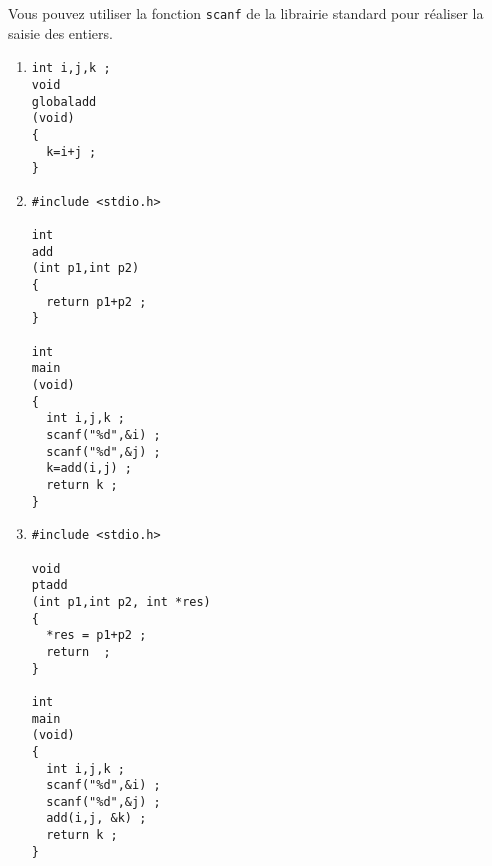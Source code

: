 Vous pouvez utiliser la fonction \texttt{scanf} de la librairie standard pour r\'ealiser la 
saisie des entiers.
\ifcorrection
\begin{correction}
  \begin{enumerate}
  \item
\begin{verbatim}
int i,j,k ;
void
globaladd
(void)
{
  k=i+j ;
}
\end{verbatim}
 \item 
\begin{verbatim}
#include <stdio.h>

int
add
(int p1,int p2)
{
  return p1+p2 ;
}

int
main
(void)
{
  int i,j,k ;
  scanf("%d",&i) ;
  scanf("%d",&j) ;
  k=add(i,j) ;  
  return k ;
}
\end{verbatim}

 \item 
\begin{verbatim}
#include <stdio.h>

void
ptadd
(int p1,int p2, int *res)
{
  *res = p1+p2 ;
  return  ;
}

int
main
(void)
{
  int i,j,k ;
  scanf("%d",&i) ;
  scanf("%d",&j) ;
  add(i,j, &k) ;  
  return k ;
}
\end{verbatim}
  \end{enumerate}
\end{correction}
\fi